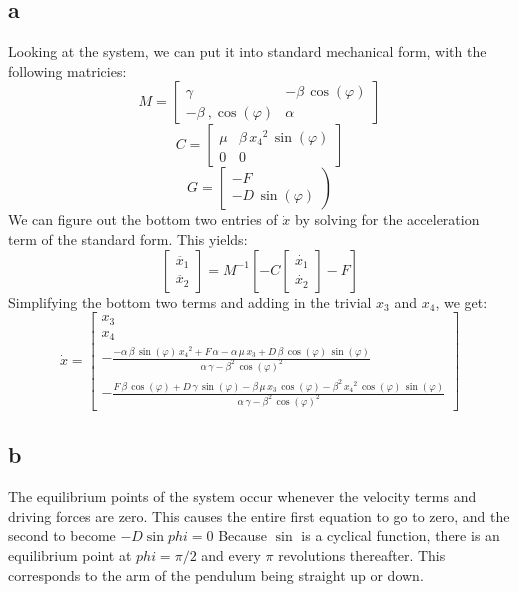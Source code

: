 \documentclass[11pt]{article}
\begin{document}
\subsection*{a}
Looking at the system, we can put it into standard mechanical form, with the following matricies:
$$
M = \left[\begin{array}{cc} \gamma & -\beta\,\cos\left(\varphi \right)\\ -\beta\
,\cos\left(\varphi \right) & \alpha  \end{array}\right]
$$
$$
C=\left[\begin{array}{cc} \mu  & \beta\,{x_{4}}^2\,\sin\left(\varphi \right)\\ 
        0 & 0 
\end{array}\right]
$$
$$
G=\left[\begin{array}{c} -F\\ -D\,\sin\left(\varphi \right) \end{array}\right)
$$
We can figure out the bottom two entries of $\dot{x}$ by solving for the acceleration term of the standard form. This yields:
$$
\begin{bmatrix}
    \ddot{x_1}\\
    \ddot{x_2}
\end{bmatrix}
=
M^{-1}\left[-C
\begin{bmatrix}
    \dot{x_1}\\
    \dot{x_2}
\end{bmatrix}
-F\right]
$$
Simplifying the bottom two terms and adding in the trivial $x_3$ and $x_4$, we get:
$$
\dot{x}=
\left[\begin{array}{c}
        x_{3}\\ 
        x_{4}\\
        -\frac{-\alpha \,\beta\,\sin\left(\varphi \right)\,{x _{4}}^2+F\,\alpha -\alpha \,\mu \,x_{3}+D\,\beta\,\cos\left(\varphi \right)\,\sin\left(\varphi\right)}{\alpha \,\gamma-{\beta}^2\,{\cos\left(\varphi \right)}^2}\\
        -\frac{F\,\beta\,\cos\left(\varphi \right)+D\,\gamma\,\sin\left(\varphi \right)-\beta\,\mu \,x_{3}\,\cos\left(\varphi \right)-{\beta}^2\,{x_{4}}^2\,\cos\left(\varphi \right)\,\sin\left(\varphi \right) }{\alpha \,\gamma-{\beta}^2\,{\cos\left(\varphi \right)}^2}
\end{array}\right]
$$
\subsection*{b}
The equilibrium points of the system occur whenever the velocity terms and driving forces are zero. This causes the entire first equation to go to zero,
and the second to become $-D\sin{phi}=0$ Because $\sin$ is a cyclical function, there is an equilibrium point at $phi = \pi/2$ and every $\pi$ revolutions thereafter.
This corresponds to the arm of the pendulum being straight up or down.
\end{document}
